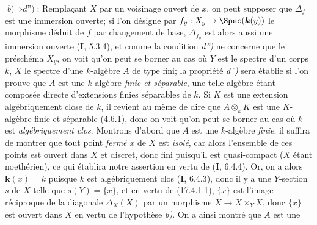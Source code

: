 $\textit{b)}\Rightarrow\textit{d'')}$: Remplaçant $X$ par un voisinage ouvert de $x$, on peut supposer que $\Delta_f$ est une immersion ouverte; si l'on désigne par $f_y:X_y\to\Spec(\boldsymbol{k}(y))$ le morphisme déduit de $f$ par changement de base, $\Delta_{f_y}$ est alors aussi une immersion ouverte (\textbf{I}, 5.3.4), et comme la condition \emph{d'')} ne concerne que le préschéma $X_y$, on voit qu'on peut se borner au cas où $Y$ est le spectre d'un corps $k$, $X$ le spectre d'une $k$-algèbre $A$ de type fini; la propriété \emph{d'')} sera établie si l'on prouve que $A$ est une $k$-algèbre \emph{finie et séparable}, une telle algèbre étant composée directe d'extensions finies séparables de $k$. Si $K$ est une extension algébriquement close de $k$, il revient au même de dire que $A\otimes_k K$ est une $K$-algèbre finie et séparable (4.6.1), donc on voit qu'on peut se borner au cas où $k$ est \emph{algébriquement clos}. Montrons d'abord que $A$ est une $k$-algèbre \emph{finie}: il suffira de montrer que tout point \emph{fermé} $x$ de $X$ est \emph{isolé}, car alors l'ensemble de ces points est ouvert dans $X$ et discret, donc fini puisqu'il est quasi-compact ($X$ étant noethérien), ce qui établira notre assertion en vertu de (\textbf{I}, 6.4.4). Or, on a alors $\boldsymbol{k}(x)=k$ puisque $k$ est algébriquement clos (\textbf{I}, 6.4.3), donc il y a une $Y$-section $s$ de $X$ telle que $s(Y)=\{x\}$, et en vertu de (17.4.1.1), $\{x\}$ est l'image réciproque de la diagonale $\Delta_X(X)$ par un morphisme $X\to X\times_Y X$, donc $\{x\}$ est ouvert dans $X$ en vertu de l'hypothèse \emph{b)}. On a ainsi montré que $A$ est une
